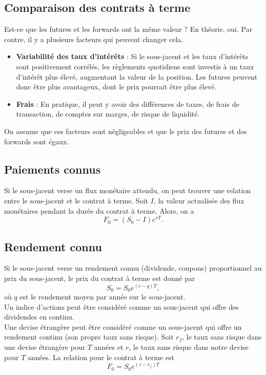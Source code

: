 \subsection{Comparaison des contrats à terme}

Est-ce que les futures et les forwards ont la même valeur ?  En théorie, oui. Par contre, il y a plusieurs facteurs qui peuvent changer cela. 

\begin{itemize}
	\item \textbf{Variabilité des taux d'intérêts } : Si le sous-jacent et les taux d'intérêts sont positivement corrélés, les règlements quotidiens sont investis à un taux d'intérêt plus élevé, augmentant la valeur de la position. Les futures peuvent donc être plus avantageux, dont le prix pourrait être plus élevé.
	\item \textbf{Frais} : En pratique, il peut y avoir des différences de taxes, de frais de transaction, de comptes sur marges, de risque de liquidité. 
\end{itemize}

On assume que ces facteurs sont négligeables et que le prix des futures et des forwards sont égaux. 

\subsection{Paiements connus}

Si le sous-jacent verse un flux monétaire attendu, on peut trouver une relation entre le sous-jacent et le contrat à terme. Soit $I$, la valeur actualisée des flux monétaires pendant la durée du contrat à terme. Alors, on a 
$$F_0 = (S_0 - I)e^{rT}.$$

\subsection{Rendement connu}

Si le sous-jacent verse un rendement connu (dividende, coupons) proportionnel au prix du sous-jacent, le prix du contrat à terme est donné par 
$$S_0 = S_0 e^{(r-q)T},$$
où $q$ est le rendement moyen par année sur le sous-jacent. \\

Un indice d'actions peut être considéré comme un sous-jacent qui offre des dividendes en continu. \\

Une devise étrangère peut être considéré comme un sous-jacent qui offre un rendement continu (son propre taux sans risque). Soit $r_f$, le taux sans risque dans une devise étrangère pour $T$ années et $r$, le taux sans risque dans notre devise pour $T$ années. La relation pour le contrat à terme est
$$F_0 = S_0 e^{(r-r_f)T}$$

